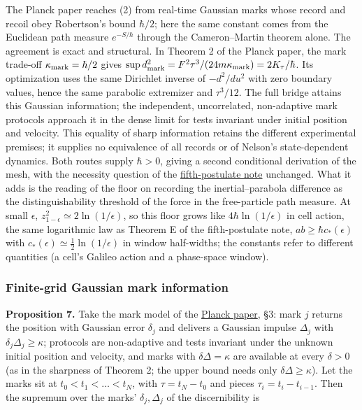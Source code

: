 \documentclass[11pt,a4paper]{article}
\begin{document}
The Planck paper reaches (2) from real-time Gaussian marks whose record
and recoil obey Robertson's bound \(\hbar/2\); here the same constant
comes from the Euclidean path measure \(e^{-S/\hbar}\) through the
Cameron--Martin theorem alone. The agreement is exact and structural. In
Theorem 2 of the Planck paper, the mark trade-off
\(\kappa_{\rm mark}=\hbar/2\) gives
\(\sup d_{\rm mark}^2=F^2\tau^3/(24m\kappa_{\rm mark})=2K_\tau/\hbar\).
Its optimization uses the same Dirichlet inverse of \(-d^2/du^2\) with
zero boundary values, hence the same parabolic extremizer and
\(\tau^3/12\). The full bridge attains this Gaussian information; the
independent, uncorrelated, non-adaptive mark protocols approach it in
the dense limit for tests invariant under initial position and velocity.
This equality of sharp information retains the different experimental
premises; it supplies no equivalence of all records or of Nelson's
state-dependent dynamics. Both routes supply \(\hbar>0\), giving a
second conditional derivation of the mesh, with the necessity question
of the \href{principia-fifth-postulate.md}{fifth-postulate note}
unchanged. What it adds is the reading of the floor on recording the
inertial--parabola difference as the distinguishability threshold of the
force in the free-particle path measure. At small \(\epsilon\),
\(z_{1-\epsilon}^2\simeq2\ln(1/\epsilon)\), so this floor grows like
\(4\hbar\ln(1/\epsilon)\) in cell action, the same logarithmic law as
Theorem E of the fifth-postulate note, \(ab\ge\hbar c_*(\epsilon)\) with
\(c_*(\epsilon)\simeq\frac12\ln(1/\epsilon)\) in window half-widths; the
constants refer to different quantities (a cell's Galileo action and a
phase-space window).

\hypertarget{finite-grid-gaussian-mark-information}{%
\subsubsection{Finite-grid Gaussian mark
information}\label{finite-grid-gaussian-mark-information}}

\textbf{Proposition 7.} Take the mark model of the
\href{planck-gap-paper.md}{Planck paper}, §3: mark \(j\) returns the
position with Gaussian error \(\delta_j\) and delivers a Gaussian
impulse \(\Delta_j\) with \(\delta_j\Delta_j\ge\kappa\); protocols are
non-adaptive and tests invariant under the unknown initial position and
velocity, and marks with \(\delta\Delta=\kappa\) are available at every
\(\delta>0\) (as in the sharpness of Theorem 2; the upper bound needs
only \(\delta\Delta\ge\kappa\)). Let the marks sit at
\(t_0<t_1<\dots<t_N\), with \(\tau=t_N-t_0\) and pieces
\(\tau_i=t_i-t_{i-1}\). Then the supremum over the marks'
\(\delta_j,\Delta_j\) of the discernibility is
\end{document}
